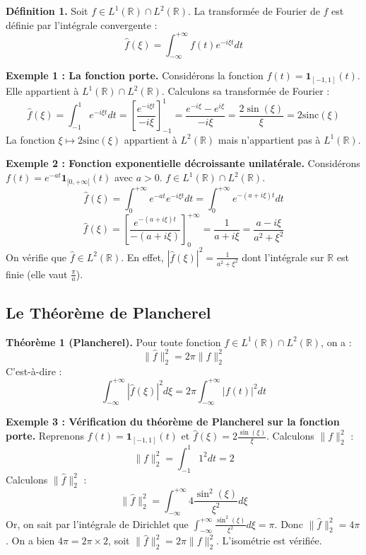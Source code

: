 \documentclass[11pt,a4paper]{article}
\begin{document}
\textbf{Définition 1.} Soit $f \in L^1(\mathbb{R}) \cap L^2(\mathbb{R})$. La transformée de Fourier de $f$ est définie par l'intégrale convergente :
$$ \hat{f}(\xi) = \int_{-\infty}^{+\infty} f(t) e^{-i\xi t} dt $$

\textbf{Exemple 1 : La fonction porte.}
Considérons la fonction $f(t) = \mathbf{1}_{[-1, 1]}(t)$. Elle appartient à $L^1(\mathbb{R}) \cap L^2(\mathbb{R})$.
Calculons sa transformée de Fourier :
$$ \hat{f}(\xi) = \int_{-1}^{1} e^{-i\xi t} dt = \left[ \frac{e^{-i\xi t}}{-i\xi} \right]_{-1}^{1} = \frac{e^{-i\xi} - e^{i\xi}}{-i\xi} = \frac{2\sin(\xi)}{\xi} = 2\text{sinc}(\xi) $$
La fonction $\xi \mapsto 2\text{sinc}(\xi)$ appartient à $L^2(\mathbb{R})$ mais n'appartient pas à $L^1(\mathbb{R})$.

\textbf{Exemple 2 : Fonction exponentielle décroissante unilatérale.}
Considérons $f(t) = e^{-at} \mathbf{1}_{[0, +\infty[}(t)$ avec $a > 0$.
$f \in L^1(\mathbb{R}) \cap L^2(\mathbb{R})$.
$$ \hat{f}(\xi) = \int_{0}^{+\infty} e^{-at} e^{-i\xi t} dt = \int_{0}^{+\infty} e^{-(a+i\xi)t} dt $$
$$ \hat{f}(\xi) = \left[ \frac{e^{-(a+i\xi)t}}{-(a+i\xi)} \right]_{0}^{+\infty} = \frac{1}{a+i\xi} = \frac{a - i\xi}{a^2 + \xi^2} $$
On vérifie que $\hat{f} \in L^2(\mathbb{R})$. En effet, $|\hat{f}(\xi)|^2 = \frac{1}{a^2 + \xi^2}$ dont l'intégrale sur $\mathbb{R}$ est finie (elle vaut $\frac{\pi}{a}$).

\subsection{Le Théorème de Plancherel}

\textbf{Théorème 1 (Plancherel).}
Pour toute fonction $f \in L^1(\mathbb{R}) \cap L^2(\mathbb{R})$, on a :
$$ \|\hat{f}\|_2^2 = 2\pi \|f\|_2^2 $$
C'est-à-dire :
$$ \int_{-\infty}^{+\infty} |\hat{f}(\xi)|^2 d\xi = 2\pi \int_{-\infty}^{+\infty} |f(t)|^2 dt $$

\textbf{Exemple 3 : Vérification du théorème de Plancherel sur la fonction porte.}
Reprenons $f(t) = \mathbf{1}_{[-1, 1]}(t)$ et $\hat{f}(\xi) = 2\frac{\sin(\xi)}{\xi}$.
Calculons $\|f\|_2^2$ :
$$ \|f\|_2^2 = \int_{-1}^{1} 1^2 dt = 2 $$
Calculons $\|\hat{f}\|_2^2$ :
$$ \|\hat{f}\|_2^2 = \int_{-\infty}^{+\infty} 4\frac{\sin^2(\xi)}{\xi^2} d\xi $$
Or, on sait par l'intégrale de Dirichlet que $\int_{-\infty}^{+\infty} \frac{\sin^2(\xi)}{\xi^2} d\xi = \pi$.
Donc $\|\hat{f}\|_2^2 = 4\pi$.
On a bien $4\pi = 2\pi \times 2$, soit $\|\hat{f}\|_2^2 = 2\pi \|f\|_2^2$. L'isométrie est vérifiée.
\end{document}
